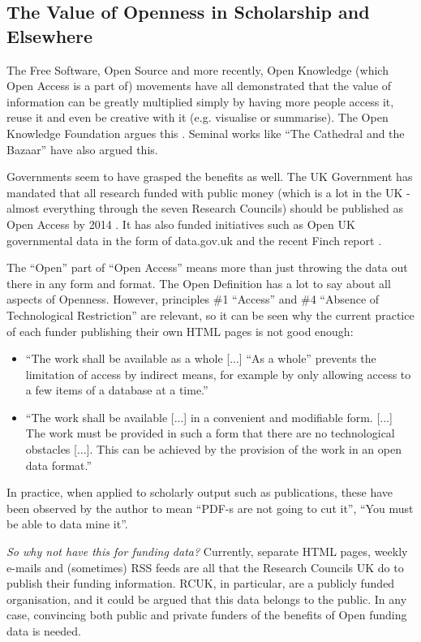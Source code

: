 \subsection{The Value of Openness in Scholarship and Elsewhere}
The Free Software, Open Source and more recently, Open Knowledge (which Open Access is a part of) movements have all demonstrated that the value of information can be greatly multiplied simply by having more people access it, reuse it and even be creative with it (e.g. visualise or summarise). The Open Knowledge Foundation argues this \cite{okfn-vision}. Seminal works like ``The Cathedral and the Bazaar'' \cite{catb} have also argued this.

Governments seem to have grasped the benefits as well. The UK Government has mandated that all research funded with public money (which is a lot in the UK - almost everything through the seven Research Councils) should be published as Open Access by 2014 \cite{guardian-ukgov-oa2014}. It has also funded initiatives such as Open UK governmental data in the form of data.gov.uk \cite{open-uk-gov-data} and the recent Finch report \cite{guardian-finch} \cite{finch}.

The ``Open'' part of ``Open Access'' means more than just throwing the data out there in any form and format. The Open Definition \cite{od} has a lot to say about all aspects of Openness. However, principles \#1 ``Access'' and \#4 ``Absence of Technological Restriction'' are relevant, so it can be seen why the current practice of each funder publishing their own HTML pages is not good enough:

\begin{itemize}
 \item ``The work shall be available as a whole [...] ``As a whole'' prevents the limitation of access by indirect means, for example by only allowing access to a few items of a database at a time.''
 \item ``The work shall be available [...] in a convenient and modifiable form. [...] The work must be provided in such a form that there are no technological obstacles [...]. This can be achieved by the provision of the work in an open data format.''
\end{itemize}

In practice, when applied to scholarly output such as publications, these have been observed by the author to mean ``PDF-s are not going to cut it'', ``You must be able to data mine it''.

\emph{So why not have this for funding data?} Currently, separate HTML pages, weekly e-mails and (sometimes) RSS feeds are all that the Research Councils UK do to publish their funding information. RCUK, in particular, are a publicly funded organisation, and it could be argued that this data belongs to the public. In any case, convincing both public and private funders of the benefits of Open funding data is needed.

